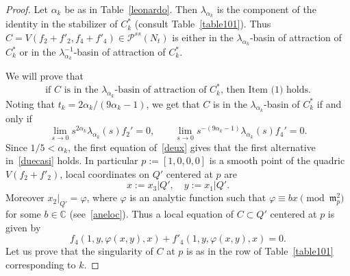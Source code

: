 \documentclass[11pt]{amsart}
\numberwithin{equation}{section}
\theoremstyle{plain}
\theoremstyle{remark}
\theoremstyle{definition}
\newcommand{\CC}{{\mathbb C}}
\newcommand{\cP}{{\mathscr P}}
\newcommand{\gm}{\mathfrak{m}}
\begin{document}
 \begin{proof}
Let $\alpha_k$ be as in  Table~\ref{leonardo}. Then $\lambda_{\alpha_k}$ is the component of the identity in the stabilizer of $C^{*}_k$ (consult Table~\ref{table101}). Thus $C =V(f_2+f'_2,f_4+f'_4)\in\cP^{ss}(N_t)$ is either in the $\lambda_{\alpha_k}$-basin of attraction of $C^{*}_k$ or in the $\lambda^{- 1}_{\alpha_k}$-basin of attraction of $C^{*}_k$. 

\medskip

   We will prove that 
%
\begin{equation}\label{gallinari}
%
\text{if $C$ is in the $\lambda_{\alpha_k}$-basin of attraction of $C^{*}_k$, then Item~(1) holds.}
%
\end{equation}
%
Noting  that $t_k=2\alpha_k/(9\alpha_k-1)$, we get that $C$ is in the 
$\lambda_{\alpha_k}$-basin of $C^{*}_k$ if and only if 
%
\begin{equation}\label{deux}
%
\lim\limits_{s\to 0}s^{2\alpha_k}\lambda_{\alpha_k}(s)f_2'=0,\qquad 
\lim\limits_{s\to 0}s^{-(9\alpha_k-1)}\lambda_{\alpha_k}(s)f_4'=0.
%
\end{equation}
%
Since $1/5<\alpha_k$, the first equation of~\eqref{deux} gives that the first alternative in~\eqref{duecasi} holds. In particular $p:=[1,0,0,0]$ is a smooth point of the quadric $V(f_2+f'_2)$, local coordinates on $Q'$ centered at $p$ are
%
\begin{equation*}
%
x:=x_3|{Q'},\quad y:=x_1|{Q'}.
%
\end{equation*}
% 
Moreover $x_2|_{Q'}=\varphi$, where $\varphi$ is an analytic function such that $\varphi\equiv bx\pmod{\gm_p^2}$ for some $b\in \CC$  (see~\eqref{aneloc}). 
Thus a local equation of $C\subset Q'$ centered at $p$ is given by
%
\begin{equation*}
%
f_4(1,y,\varphi(x,y),x)+f'_4(1,y,\varphi(x,y),x)=0.
%
\end{equation*}
%
Let us prove that the singularity of $C$ at $p$ is as in  the  row of Table~\ref{table101} corresponding to $k$. 
 

\end{proof}
\end{document}
